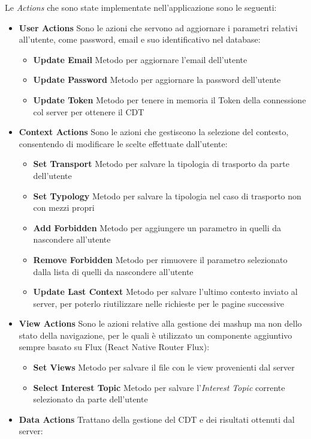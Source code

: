 Le \emph{Actions} che sono state implementate nell'applicazione sono le seguenti:
\begin{itemize}
	\item \textbf{User Actions} Sono le azioni che servono ad aggiornare i parametri relativi all'utente, come password, email e suo identificativo nel database:
	\begin{itemize}
		\item \textbf{Update Email} Metodo per aggiornare l'email dell'utente 
		\item \textbf{Update Password} Metodo per aggiornare la password dell'utente
		\item \textbf{Update Token} Metodo per tenere in memoria il Token della connessione col server per ottenere il CDT
	\end{itemize}
	\item \textbf{Context Actions} Sono le azioni che gestiscono la selezione del contesto, consentendo di modificare le scelte effettuate dall'utente:
	\begin{itemize}
		\item \textbf{Set Transport} Metodo per salvare la tipologia di trasporto da parte dell'utente
		\item \textbf{Set Typology} Metodo per salvare la tipologia nel caso di trasporto non con mezzi propri
		\item \textbf{Add Forbidden} Metodo per aggiungere un parametro in quelli da nascondere all'utente
		\item \textbf{Remove Forbidden} Metodo per rimuovere il parametro selezionato dalla lista di quelli da nascondere all'utente
		\item \textbf{Update Last Context} Metodo per salvare l'ultimo contesto inviato al server, per poterlo riutilizzare nelle richieste per le pagine successive
	\end{itemize}
	\item \textbf{View Actions} Sono le azioni relative alla gestione dei mashup ma non dello stato della navigazione, per le quali è utilizzato un componente aggiuntivo sempre basato su Flux (React Native Router Flux):
	\begin{itemize}
		\item \textbf{Set Views} Metodo per salvare il file con le view provenienti dal server 
		\item \textbf{Select Interest Topic} Metodo per salvare l'\emph{Interest Topic} corrente selezionato da parte dell'utente
	\end{itemize}
	\item \textbf{Data Actions} Trattano della gestione del CDT e dei risultati ottenuti dal server:

\end{itemize}
